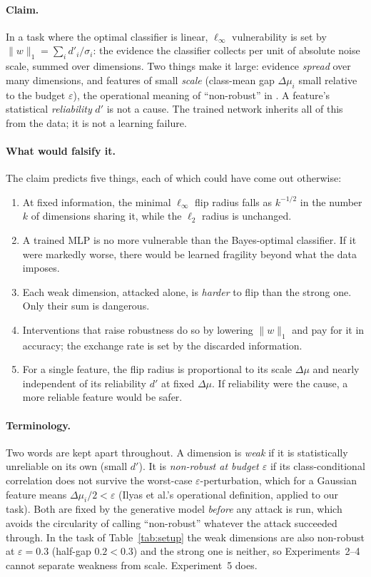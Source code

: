 \documentclass[11pt]{article}
\newcommand{\linf}{\ell_\infty}
\newcommand{\ltwo}{\ell_2}
\begin{document}
\paragraph{Claim.} In a task where the optimal classifier is linear, $\linf$
vulnerability is set by $\|w\|_1=\sum_i d'_i/\sigma_i$: the evidence the
classifier collects per unit of absolute noise scale, summed over dimensions.
Two things make it large: evidence \emph{spread} over many dimensions, and
features of small \emph{scale} (class-mean gap $\Delta\mu_i$ small relative to
the budget $\varepsilon$), the operational meaning of ``non-robust'' in
\cite{ilyas2019}. A feature's statistical \emph{reliability} $d'$ is not a
cause. The trained network inherits all of this from the data; it is not a
learning failure.

\paragraph{What would falsify it.} The claim predicts five things, each of
which could have come out otherwise:

\begin{enumerate}
\item[\textbf{P1}] At fixed information, the minimal $\linf$ flip radius falls as
$k^{-1/2}$ in the number $k$ of dimensions sharing it, while the $\ltwo$ radius
is unchanged.
\item[\textbf{P2}] A trained MLP is no more vulnerable than the Bayes-optimal
classifier. If it were markedly worse, there would be learned fragility beyond
what the data imposes.
\item[\textbf{P3}] Each weak dimension, attacked alone, is \emph{harder} to flip
than the strong one. Only their sum is dangerous.
\item[\textbf{P4}] Interventions that raise robustness do so by lowering
$\|w\|_1$ and pay for it in accuracy; the exchange rate is set by the discarded
information.
\item[\textbf{P5}] For a single feature, the flip radius is proportional to its
scale $\Delta\mu$ and nearly independent of its reliability $d'$ at fixed
$\Delta\mu$. If reliability were the cause, a more reliable feature would be
safer.
\end{enumerate}

\paragraph{Terminology.} Two words are kept apart throughout. A dimension is
\emph{weak} if it is statistically unreliable on its own (small $d'$). It is
\emph{non-robust at budget $\varepsilon$} if its class-conditional correlation
does not survive the worst-case $\varepsilon$-perturbation, which for a Gaussian
feature means $\Delta\mu_i/2<\varepsilon$ (Ilyas et al.'s operational
definition, applied to our task). Both are fixed by the generative model
\emph{before} any attack is run, which avoids the circularity of calling
``non-robust'' whatever the attack succeeded through. In the task of
Table~\ref{tab:setup} the weak dimensions are also non-robust at $\varepsilon=0.3$
(half-gap $0.2<0.3$) and the strong one is neither, so Experiments~2--4 cannot
separate weakness from scale. Experiment~5 does.
\end{document}

